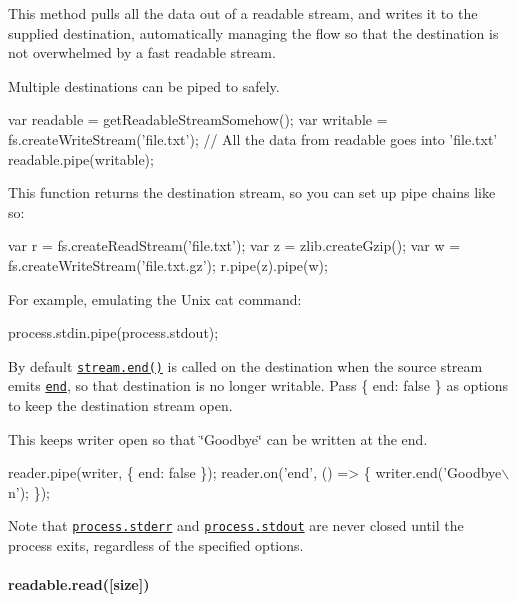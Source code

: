 This method pulls all the data out of a readable stream, and writes it to the supplied destination, automatically managing the flow so that the destination is not overwhelmed by a fast readable stream.

Multiple destinations can be piped to safely.


\begin{DoxyCode}
var readable = getReadableStreamSomehow();
var writable = fs.createWriteStream('file.txt');
// All the data from readable goes into 'file.txt'
readable.pipe(writable);
\end{DoxyCode}


This function returns the destination stream, so you can set up pipe chains like so\+:


\begin{DoxyCode}
var r = fs.createReadStream('file.txt');
var z = zlib.createGzip();
var w = fs.createWriteStream('file.txt.gz');
r.pipe(z).pipe(w);
\end{DoxyCode}


For example, emulating the Unix {\ttfamily cat} command\+:


\begin{DoxyCode}
process.stdin.pipe(process.stdout);
\end{DoxyCode}


By default \href{#stream_writable_end_chunk_encoding_callback}{\tt {\ttfamily stream.\+end()}} is called on the destination when the source stream emits \href{#stream_event_end}{\tt {\ttfamily \textquotesingle{}end\textquotesingle{}}}, so that {\ttfamily destination} is no longer writable. Pass {\ttfamily \{ end\+: false \}} as {\ttfamily options} to keep the destination stream open.

This keeps {\ttfamily writer} open so that \char`\"{}\+Goodbye\char`\"{} can be written at the end.


\begin{DoxyCode}
reader.pipe(writer, \{ end: false \});
reader.on('end', () => \{
  writer.end('Goodbye\(\backslash\)n');
\});
\end{DoxyCode}


Note that \href{https://nodejs.org/docs/v5.8.0/api/process.html#process_process_stderr}{\tt {\ttfamily process.\+stderr}} and \href{https://nodejs.org/docs/v5.8.0/api/process.html#process_process_stdout}{\tt {\ttfamily process.\+stdout}} are never closed until the process exits, regardless of the specified options.

\paragraph*{readable.\+read(\mbox{[}size\mbox{]})}


